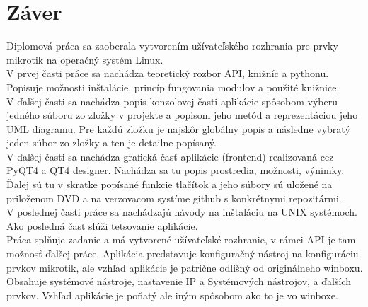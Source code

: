 \chapter{Záver}
Diplomová práca sa zaoberala vytvorením užívateľského rozhrania pre prvky mikrotik na operačný systém Linux. \\
V prvej časti práce sa nachádza teoretický rozbor API, knižníc a pythonu. Popisuje možnosti inštalácie, princíp fungovania modulov a použité knižnice.\\
V ďalšej časti sa nachádza popis konzolovej časti aplikácie spôsobom výberu jedného súboru zo zložky v projekte a popisom jeho metód  a reprezentáciou jeho UML diagramu. Pre každú zložku je najskôr globálny popis a následne vybratý jeden súbor zo zložky a ten je detailne popísaný.\\
V ďalšej časti  sa nachádza grafická časť aplikácie (frontend) realizovaná cez PyQT4 a QT4 designer. Nachádza sa tu popis prostredia, možnosti, výnimky. Ďalej sú tu v skratke popísané funkcie tlačítok a jeho súbory sú uložené na priloženom DVD a na verzovacom systíme github s konkrétnymi repozitármi.\\
V poslednej časti  práce sa nachádzajú návody na inštaláciu na UNIX systémoch. Ako posledná časť slúži tetsovanie aplikácie. \\
Práca splňuje zadanie a má vytvorené užívateľské rozhranie,  v rámci API je tam možnosť ďalšej práce. Aplikácia predstavuje konfiguračný nástroj na konfiguráciu prvkov mikrotik, ale vzhľad aplikácie je patrične odlišný od originálneho winboxu. Obsahuje systémové nástroje, nastavenie IP a Systémových nástrojov, a ďalších prvkov. Vzhľad aplikácie je poňatý ale iným spôsobom ako to je vo winboxe. 